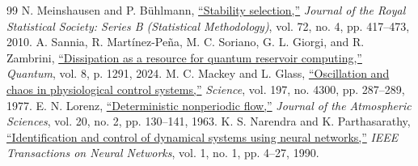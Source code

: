 \documentclass[10pt,conference]{IEEEtran}
\begin{document}
{\begin{thebibliography}{99}
 N. Meinshausen and P. B\"{u}hlmann, \href{https://doi.org/10.1111/j.1467-9868.2010.00740.x}{``Stability selection,''} \emph{Journal of the Royal Statistical Society: Series B (Statistical Methodology)}, vol. 72, no. 4, pp. 417--473, 2010.
 A. Sannia, R. Mart{\'i}nez-Pe\~{n}a, M. C. Soriano, G. L. Giorgi, and R. Zambrini, \href{https://doi.org/10.22331/q-2024-03-20-1291}{``Dissipation as a resource for quantum reservoir computing,''} \emph{Quantum}, vol. 8, p. 1291, 2024.
 M. C. Mackey and L. Glass, \href{https://doi.org/10.1126/science.267326}{``Oscillation and chaos in physiological control systems,''} \emph{Science}, vol. 197, no. 4300, pp. 287--289, 1977.
 E. N. Lorenz, \href{https://doi.org/10.1175/1520-0469(1963)020\%3C0130:DNF\%3E2.0.CO;2}{``Deterministic nonperiodic flow,''} \emph{Journal of the Atmospheric Sciences}, vol. 20, no. 2, pp. 130--141, 1963.
 K. S. Narendra and K. Parthasarathy, \href{https://doi.org/10.1109/72.80202}{``Identification and control of dynamical systems using neural networks,''} \emph{IEEE Transactions on Neural Networks}, vol. 1, no. 1, pp. 4--27, 1990.
\end{thebibliography}
}
\end{document}

